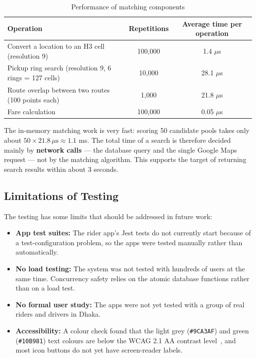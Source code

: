 \begin{table}[H]
  \centering
  \small
  \caption{Performance of matching components}
  \label{tab:benchmarks}
  \begin{tabularx}{\textwidth}{@{}Lcc@{}}
    \toprule
    \textbf{Operation} & \textbf{Repetitions} & \textbf{Average time per operation} \\
    \midrule
    Convert a location to an H3 cell (resolution 9) & 100,000 & 1.4 $\mu$s \\
    Pickup ring search (resolution 9, 6 rings = 127 cells) & 10,000 & 28.1 $\mu$s \\
    Route overlap between two routes (100 points each) & 1,000 & 21.8 $\mu$s \\
    Fare calculation & 100,000 & 0.05 $\mu$s \\
    \bottomrule
  \end{tabularx}
\end{table}

The in-memory matching work is very fast: scoring 50 candidate pools takes
only about $50 \times 21.8\,\mu\mathrm{s} \approx 1.1$ ms. The total time of a
search is therefore decided mainly by \textbf{network calls} --- the database
query and the single Google Maps request --- not by the matching algorithm.
This supports the target of returning search results within about 3 seconds.

\subsection{Limitations of Testing}
\label{subsec:testing-limits}

The testing has some limits that should be addressed in future work:

\begin{itemize}
  \item \textbf{App test suites:} The rider app's Jest tests do not currently
        start because of a test-configuration problem, so the apps were tested
        manually rather than automatically.
  \item \textbf{No load testing:} The system was not tested with hundreds of
        users at the same time. Concurrency safety relies on the atomic
        database functions rather than on a load test.
  \item \textbf{No formal user study:} The apps were not yet tested with a
        group of real riders and drivers in Dhaka.
  \item \textbf{Accessibility:} A colour check found that the light grey
        (\texttt{\#9CA3AF}) and green (\texttt{\#10B981}) text colours are
        below the WCAG 2.1 AA contrast level~\cite{wcag21}, and most icon
        buttons do not yet have screen-reader labels.
\end{itemize}
